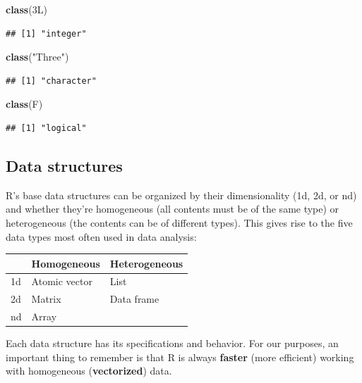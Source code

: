 \documentclass[
]{book}
\newenvironment{Shaded}{\begin{snugshade}}{\end{snugshade}}
\newcommand{\DataTypeTok}[1]{\textcolor[rgb]{0.13,0.29,0.53}{#1}}
\newcommand{\DecValTok}[1]{\textcolor[rgb]{0.00,0.00,0.81}{#1}}
\newcommand{\FunctionTok}[1]{\textcolor[rgb]{0.13,0.29,0.53}{\textbf{#1}}}
\newcommand{\NormalTok}[1]{#1}
\newcommand{\StringTok}[1]{\textcolor[rgb]{0.31,0.60,0.02}{#1}}
\begin{document}
\begin{Shaded}
\begin{Highlighting}[]
\FunctionTok{class}\NormalTok{(}\DecValTok{3}\DataTypeTok{L}\NormalTok{)}
\end{Highlighting}
\end{Shaded}

\begin{verbatim}
## [1] "integer"
\end{verbatim}

\begin{Shaded}
\begin{Highlighting}[]
\FunctionTok{class}\NormalTok{(}\StringTok{"Three"}\NormalTok{)}
\end{Highlighting}
\end{Shaded}

\begin{verbatim}
## [1] "character"
\end{verbatim}

\begin{Shaded}
\begin{Highlighting}[]
\FunctionTok{class}\NormalTok{(F)}
\end{Highlighting}
\end{Shaded}

\begin{verbatim}
## [1] "logical"
\end{verbatim}

\subsection{Data structures}\label{data-structures}

R's base data structures can be organized by their dimensionality (1d, 2d, or nd) and whether they're homogeneous (all contents must be of the same type) or heterogeneous (the contents can be of different types). This gives rise to the five data types most often used in data analysis:

\begin{longtable}[]{@{}lll@{}}
\toprule\noalign{}
& Homogeneous & Heterogeneous \\
\midrule\noalign{}
\endhead
\bottomrule\noalign{}
\endlastfoot
1d & Atomic vector & List \\
2d & Matrix & Data frame \\
nd & Array & \\
\end{longtable}

Each data structure has its specifications and behavior. For our purposes, an important thing to remember is that R is always \textbf{faster} (more efficient) working with homogeneous (\textbf{vectorized}) data.
\end{document}
